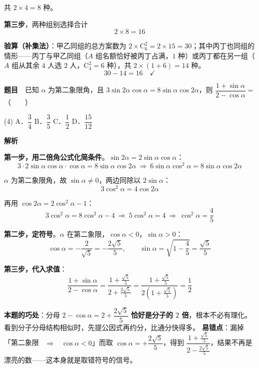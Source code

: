 共 $2\times4=8$ 种。

\textbf{第三步}，两种组别选择合计
\[2\times8=16\]


\begin{gktip}
\textbf{验算（补集法）}：甲乙同组的总方案数为 $2\times\mathrm{C}_6^2=2\times15=30$；其中丙丁也同组的情形——丙丁与甲乙同组（$A$ 组名额恰好被丙丁占满，$1$ 种）或丙丁都在另一组（$A$ 组从其余 $4$ 人选 $2$ 人，$\mathrm{C}_4^2=6$ 种），共 $2\times(1+6)=14$ 种。
\[30-14=16\quad\checkmark\]
\end{gktip}

\par\medskip


\textbf{题目}　已知 $\alpha$ 为第二象限角，且 $3\sin2\alpha\cos\alpha=8\sin\alpha\cos2\alpha$，则 $\dfrac{1+\sin\alpha}{2-\cos\alpha}=$（　　）

\begin{gkopts}(4)
\task A．$\dfrac{3}{4}$
\task B．$\dfrac{3}{5}$
\task C．$\dfrac{1}{2}$
\task D．$\dfrac{15}{12}$
\end{gkopts}

\textbf{解析}

\textbf{第一步，用二倍角公式化简条件}。$\sin2\alpha=2\sin\alpha\cos\alpha$：
\[3\cdot2\sin\alpha\cos\alpha\cdot\cos\alpha=8\sin\alpha\cos2\alpha\ \Longrightarrow\ 6\sin\alpha\cos^2\alpha=8\sin\alpha\cos2\alpha\]

$\alpha$ 为第二象限角，故 $\sin\alpha\ne0$，两边同除以 $2\sin\alpha$：
\[3\cos^2\alpha=4\cos2\alpha\]

再用 $\cos2\alpha=2\cos^2\alpha-1$：
\[3\cos^2\alpha=8\cos^2\alpha-4\ \Longrightarrow\ 5\cos^2\alpha=4\ \Longrightarrow\ \cos^2\alpha=\frac45\]

\textbf{第二步，定符号}。$\alpha$ 在第二象限，$\cos\alpha<0$，$\sin\alpha>0$：
\[\cos\alpha=-\frac{2}{\sqrt5}=-\frac{2\sqrt5}{5},\qquad \sin\alpha=\sqrt{1-\frac45}=\frac{\sqrt5}{5}\]

\textbf{第三步，代入求值}：
\[\frac{1+\sin\alpha}{2-\cos\alpha}=\frac{1+\frac{\sqrt5}{5}}{2+\frac{2\sqrt5}{5}}=\frac{1+\frac{\sqrt5}{5}}{2\left(1+\frac{\sqrt5}{5}\right)}=\frac12\]


\begin{gktip}
\textbf{本题的巧处}：分母 $2-\cos\alpha=2+\dfrac{2\sqrt5}{5}$ \textbf{恰好是分子的 $2$ 倍}，根本不必有理化。看到分子分母结构相似时，先提公因式再约分，比通分快得多。
\textbf{易错点}：漏掉「第二象限 ~$\Longrightarrow$~ $\cos\alpha<0$」而取 $\cos\alpha=+\dfrac{2\sqrt5}{5}$，得到 $\dfrac{1+\frac{\sqrt5}{5}}{2-\frac{2\sqrt5}{5}}$，结果不再是漂亮的数——这本身就是取错符号的信号。
\end{gktip}

